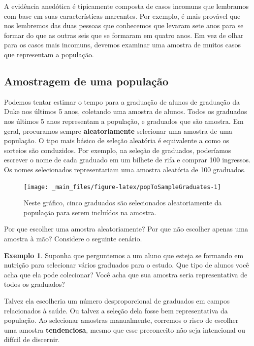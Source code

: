 \documentclass[
]{book}
\theoremstyle{definition}
\theoremstyle{definition}
\newtheorem{example}{Exemplo}[chapter]
\theoremstyle{definition}
\theoremstyle{definition}
\theoremstyle{remark}
\begin{document}
A evidência anedótica é tipicamente composta de casos incomuns que lembramos com base em suas características marcantes. Por exemplo, é mais provável que nos lembremos das duas pessoas que conhecemos que levaram sete anos para se formar do que as outras seis que se formaram em quatro anos. Em vez de olhar para os casos mais incomuns, devemos examinar uma amostra de muitos casos que representam a população.

\hypertarget{popSampling}{%
\subsection{Amostragem de uma população}\label{popSampling}}

Podemos tentar estimar o tempo para a graduação de alunos de graduação da Duke nos últimos 5 anos, coletando uma amostra de alunos. Todos os graduados nos últimos 5 anos representam a população, e graduados que são amostra. Em geral, procuramos sempre \textbf{aleatoriamente} selecionar uma amostra de uma população. O tipo mais básico de seleção aleatória é equivalente a como os sorteios são conduzidos. Por exemplo, na seleção de graduados, poderíamos escrever o nome de cada graduado em um bilhete de rifa e comprar 100 ingressos. Os nomes selecionados representariam uma amostra aleatória de 100 graduados.

\begin{figure}
\texttt{[image: \_main\_files/figure-latex/popToSampleGraduates-1]} \caption{Neste gráfico, cinco graduados são selecionados aleatoriamente da população para serem incluídos na amostra.}\label{fig:popToSampleGraduates}
\end{figure}

Por que escolher uma amostra aleatoriamente? Por que não escolher apenas uma amostra à mão? Considere o seguinte cenário.

\begin{example}
\protect\hypertarget{exm:unnamed-chunk-8}{}{\label{exm:unnamed-chunk-8} }Suponha que perguntemos a um aluno que esteja se formando em nutrição para selecionar vários graduados para o estudo. Que tipo de alunos você acha que ela pode colecionar? Você acha que sua amostra seria representativa de todos os graduados?
\end{example}

Talvez ela escolheria um número desproporcional de graduados em campos relacionados à saúde. Ou talvez a seleção dela fosse bem representativa da população. Ao selecionar amostras manualmente, corremos o risco de escolher uma amostra \textbf{tendenciosa}, mesmo que esse preconceito não seja intencional ou difícil de discernir.
\end{document}
